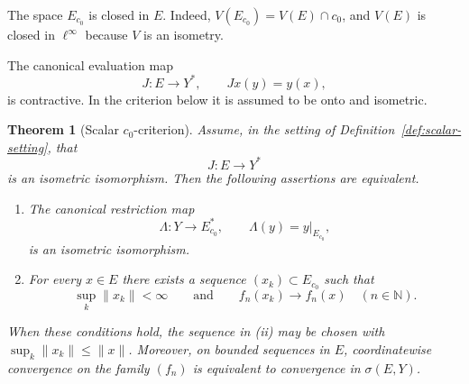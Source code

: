 \documentclass[11pt]{amsart}
\theoremstyle{plain}
\newtheorem{theorem}{Theorem}[section]
\theoremstyle{definition}
\theoremstyle{remark}
\newcommand{\N}{\mathbb N}
\begin{document}
The space $E_{c_0}$ is closed in $E$. Indeed,
$V(E_{c_0})=V(E)\cap c_0$, and $V(E)$ is closed in $\ell^\infty$ because
$V$ is an isometry.

The canonical evaluation map
\[
        J:E\longrightarrow Y^*,\qquad Jx(y)=y(x),
\]
is contractive. In the criterion below it is assumed to be onto and
isometric.

\begin{theorem}[Scalar $c_0$-criterion]\label{thm:scalar-c0}
Assume, in the setting of Definition~\ref{def:scalar-setting}, that
\[
        J:E\longrightarrow Y^*
\]
is an isometric isomorphism. Then the following assertions are equivalent.

\begin{enumerate}[label=\textup{(\roman*)}]
\item The canonical restriction map
\[
        \Lambda:Y\longrightarrow E_{c_0}^*,
        \qquad
        \Lambda(y)=y|_{E_{c_0}},
\]
is an isometric isomorphism.

\item For every $x\in E$ there exists a sequence $(x_k)\subset E_{c_0}$
such that
\[
        \sup_k\|x_k\|<\infty
        \qquad\text{and}\qquad
        f_n(x_k)\longrightarrow f_n(x)
        \quad(n\in\N).
\]
\end{enumerate}

When these conditions hold, the sequence in \textup{(ii)} may be chosen
with $\sup_k\|x_k\|\le \|x\|$. Moreover, on bounded sequences in $E$,
coordinatewise convergence on the family $(f_n)$ is equivalent to
convergence in $\sigma(E,Y)$.
\end{theorem}
\end{document}
